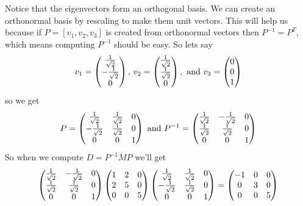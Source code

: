 {Notice that the eigenvectors form an orthogonal basis. We can create an orthonormal basis by rescaling to make them unit vectors. This will help us because if $P = [v_1,v_2,v_3]$ is created from orthonormal vectors then $P^{-1}=P^T$, which means computing $P^{-1}$ should be easy. So lets say 
\[
v_1 = \colvec{\frac{1}{\sqrt{2}}\\-\frac{1}{\sqrt{2}}\\\mc0}, \, v_2 = \colvec{\frac{1}{\sqrt{2}}\\\frac{1}{\sqrt{2}}\\\mc0}, \text{ and } v_3 = \colvec{0\\0\\1}
\]
so we get 
\[P=
\begin{pmatrix}
\frac{1}{\sqrt{2}} & \frac{1}{\sqrt{2}}& 0\\
-\frac{1}{\sqrt{2}} &\frac{1}{\sqrt{2}}& 0\\
\mc0&\mc0 & 1
\end{pmatrix} \text{ and }
P^{-1}=
 \begin{pmatrix}
\frac{1}{\sqrt{2}} & -\frac{1}{\sqrt{2}}& 0\\
\frac{1}{\sqrt{2}} &\frac{1}{\sqrt{2}}& 0\\
\mc0&\mc0 & 1
\end{pmatrix}
\]
So when we compute $D= P^{-1} M P$ we'll get 
\[
 \begin{pmatrix}
\frac{1}{\sqrt{2}} & -\frac{1}{\sqrt{2}}& 0\\
\frac{1}{\sqrt{2}} &\frac{1}{\sqrt{2}}& 0\\
\mc0&\mc0 & 1
\end{pmatrix}
\begin{pmatrix}
1 &2 & 0 \\
2 & 5 & 0 \\
0& 0 & 5  \\
\end{pmatrix}
\begin{pmatrix}
\frac{1}{\sqrt{2}} & \frac{1}{\sqrt{2}}& 0\\
-\frac{1}{\sqrt{2}} &\frac{1}{\sqrt{2}}& 0\\
\mc0&\mc0 & 1
\end{pmatrix}
= \begin{pmatrix}
-1 &0 & 0 \\
0 & 3 & 0 \\
0& 0 & 5  \\
\end{pmatrix}
\]
} %



